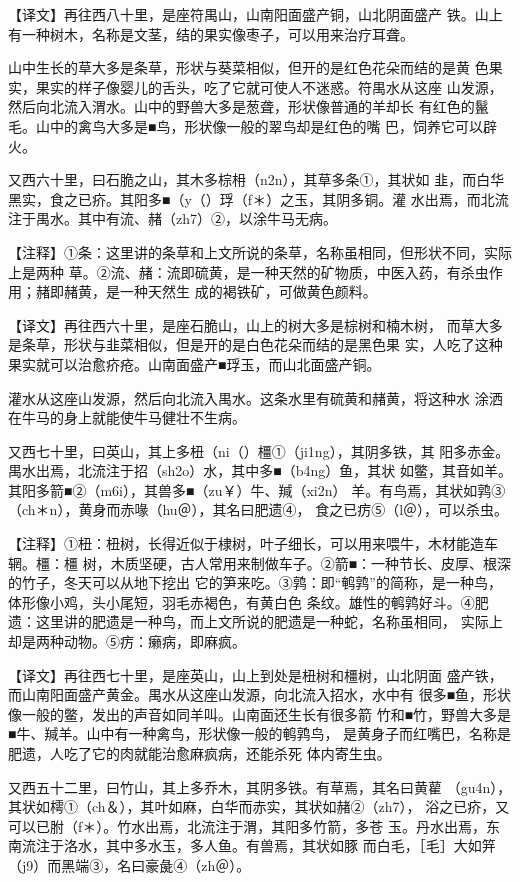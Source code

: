 \documentclass[a4paper,12pt,UTF8,twoside]{ctexbook}
\begin{document}
【译文】再往西八十里，是座符禺山，山南阳面盛产铜，山北阴面盛产 铁。山上有一种树木，名称是文茎，结的果实像枣子，可以用来治疗耳聋。

山中生长的草大多是条草，形状与葵菜相似，但开的是红色花朵而结的是黄 色果实，果实的样子像婴儿的舌头，吃了它就可使人不迷惑。符禺水从这座 山发源，然后向北流入渭水。山中的野兽大多是葱聋，形状像普通的羊却长 有红色的鬣毛。山中的禽鸟大多是■鸟，形状像一般的翠鸟却是红色的嘴 巴，饲养它可以辟火。

又西六十里，曰石脆之山，其木多棕枏（n2n），其草多条①，其状如 韭，而白华黑实，食之已疥。其阳多■（y（）琈（f＊）之玉，其阴多铜。灌 水出焉，而北流注于禺水。其中有流、赭（zh7）②，以涂牛马无病。

【注释】①条：这里讲的条草和上文所说的条草，名称虽相同，但形状不同，实际上是两种 草。②流、赭：流即硫黄，是一种天然的矿物质，中医入药，有杀虫作用；赭即赭黄，是一种天然生 成的褐铁矿，可做黄色颜料。

【译文】再往西六十里，是座石脆山，山上的树大多是棕树和楠木树， 而草大多是条草，形状与韭菜相似，但是开的是白色花朵而结的是黑色果 实，人吃了这种果实就可以治愈疥疮。山南面盛产■琈玉，而山北面盛产铜。

灌水从这座山发源，然后向北流入禺水。这条水里有硫黄和赭黄，将这种水 涂洒在牛马的身上就能使牛马健壮不生病。

又西七十里，曰英山，其上多杻（ni（）橿①（ji1ng），其阴多铁，其 阳多赤金。禺水出焉，北流注于招（sh2o）水，其中多■（b4ng）鱼，其状 如鳖，其音如羊。其阳多箭■②（m6i），其兽多■（zu￥）牛、羬（xi2n） 羊。有鸟焉，其状如鹑③（ch＊n），黄身而赤喙（hu＠），其名曰肥遗④， 食之已疠⑤（l＠），可以杀虫。

【注释】①杻：杻树，长得近似于棣树，叶子细长，可以用来喂牛，木材能造车辋。橿：橿 树，木质坚硬，古人常用来制做车子。②箭■：一种节长、皮厚、根深的竹子，冬天可以从地下挖出 它的笋来吃。③鹑：即“鹌鹑”的简称，是一种鸟，体形像小鸡，头小尾短，羽毛赤褐色，有黄白色 条纹。雄性的鹌鹑好斗。④肥遗：这里讲的肥遗是一种鸟，而上文所说的肥遗是一种蛇，名称虽相同， 实际上却是两种动物。⑤疠：癞病，即麻疯。

【译文】再往西七十里，是座英山，山上到处是杻树和橿树，山北阴面 盛产铁，而山南阳面盛产黄金。禺水从这座山发源，向北流入招水，水中有 很多■鱼，形状像一般的鳖，发出的声音如同羊叫。山南面还生长有很多箭 竹和■竹，野兽大多是■牛、羬羊。山中有一种禽鸟，形状像一般的鹌鹑鸟， 是黄身子而红嘴巴，名称是肥遗，人吃了它的肉就能治愈麻疯病，还能杀死 体内寄生虫。

又西五十二里，曰竹山，其上多乔木，其阴多铁。有草焉，其名曰黄雚 （gu4n），其状如樗①（ch＆），其叶如麻，白华而赤实，其状如赭②（zh7）， 浴之已疥，又可以已胕（f＊）。竹水出焉，北流注于渭，其阳多竹箭，多苍 玉。丹水出焉，东南流注于洛水，其中多水玉，多人鱼。有兽焉，其状如豚 而白毛，［毛］大如笄（j9）而黑端③，名曰豪彘④（zh＠）。
\end{document}
